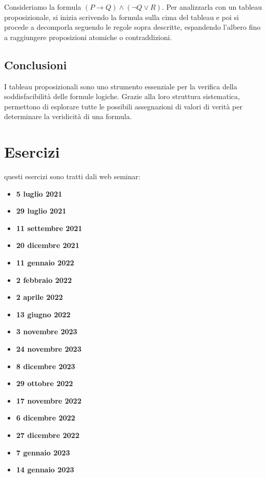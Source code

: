 \documentclass{article}
\begin{document}
Consideriamo la formula $(P \to Q) \land (\neg Q \lor R)$. Per analizzarla con un tableau proposizionale, si inizia scrivendo la formula sulla cima del tableau e poi si procede a decomporla seguendo le regole sopra descritte, espandendo l'albero fino a raggiungere proposizioni atomiche o contraddizioni.

\subsection{Conclusioni}

I tableau proposizionali sono uno strumento essenziale per la verifica della soddisfacibilità delle formule logiche. Grazie alla loro struttura sistematica, permettono di esplorare tutte le possibili assegnazioni di valori di verità per determinare la veridicità di una formula.

\newpage
\section{Esercizi}
questi esercizi sono tratti dali web seminar:
\begin{itemize}
    \item \textbf{5 luglio 2021}
    \item \textbf{29 luglio 2021}
    \item \textbf{11 settembre 2021}
    \item \textbf{20 dicembre 2021}
    \item \textbf{11 gennaio 2022}
    \item \textbf{2 febbraio 2022}
    \item \textbf{2 aprile 2022}
    \item \textbf{13 giugno 2022}
    \item \textbf{3 novembre 2023}
    \item \textbf{24 novembre 2023}
    \item \textbf{8 dicembre 2023}
    \item \textbf{29 ottobre 2022}
    \item \textbf{17 novembre 2022}    
    \item \textbf{6 dicembre 2022}
    \item \textbf{27 dicembre 2022}
    \item \textbf{7 gennaio 2023}
    \item \textbf{14 gennaio 2023}
\end{itemize}
\end{document}
